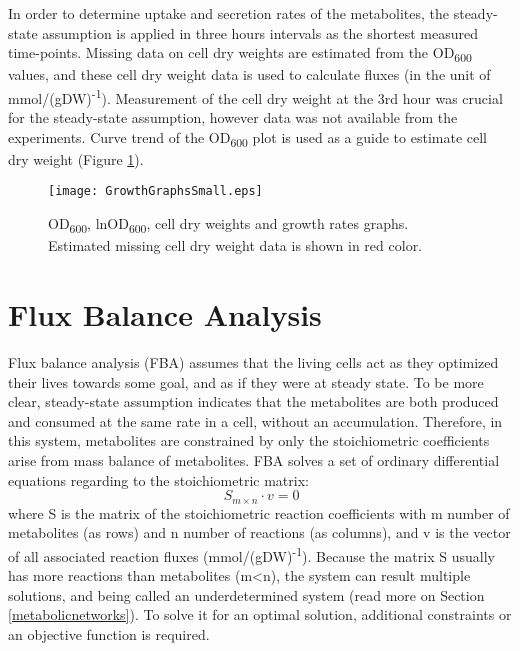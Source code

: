 \vspace{0.5cm}


In order to determine uptake and secretion rates of the metabolites, the steady-state assumption is applied in three hours intervals as the shortest measured time-points. Missing data on cell dry weights are estimated from the OD\textsubscript{600} values, and these cell dry weight data is used to calculate fluxes (in the unit of mmol/(gDW)\textsuperscript{-1}). Measurement of the cell dry weight at the 3rd hour was crucial for the steady-state assumption, however data was not available from the experiments. Curve trend of the OD\textsubscript{600} plot is used as a guide to estimate cell dry weight (Figure \ref{fig:GrowthGraphs}).

\begin{figure}[H]
  \begin{center}
  \texttt{[image: GrowthGraphsSmall.eps]}
  \end{center}
  \caption[OD\textsubscript{600}, lnOD\textsubscript{600}, cell dry weights and growth rates]{OD\textsubscript{600}, lnOD\textsubscript{600}, cell dry weights and growth rates graphs. Estimated missing cell dry weight data is shown in red color.}
\label{fig:GrowthGraphs}
\end{figure}


\vspace{-0.5cm}

\section{Flux Balance Analysis}
Flux balance analysis (FBA) assumes that the living cells act as they optimized their lives towards some goal, and as if they were at steady state. To be more clear, steady-state assumption indicates that the metabolites are both produced and consumed at the same rate in a cell, without an accumulation. Therefore, in this system, metabolites are constrained by only the stoichiometric coefficients arise from mass balance of metabolites. FBA solves a set of ordinary differential equations regarding to the stoichiometric matrix:
\begin{equation}
 \ S_{m \times n} \cdot v=0
\end{equation}
\noindent where S is the matrix of the stoichiometric reaction coefficients with m number of metabolites (as rows) and n number of reactions (as columns), and v is the vector of all associated reaction fluxes (mmol/(gDW)\textsuperscript{-1}). Because the matrix S usually has more reactions than metabolites (m<n), the system can result multiple solutions, and being called an underdetermined system (read more on Section \ref{metabolicnetworks}). To solve it for an optimal solution, additional constraints or an objective function is required.

